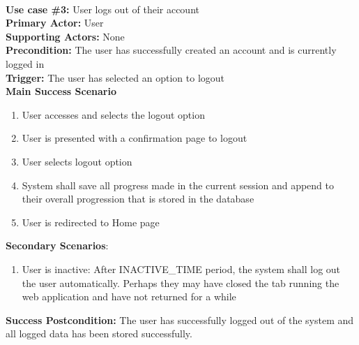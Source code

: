 \documentclass{article}
\begin{document}
\noindent\\
\textbf{Use case \#3:} User logs out of their account\\
\textbf{Primary Actor:} User\\
\textbf{Supporting Actors:} None\\
\textbf{Precondition:} The user has successfully created an account and is currently logged in\\
\textbf{Trigger:} The user has selected an option to logout\\
\textbf{Main Success Scenario}
\begin{enumerate}
    \item User accesses and selects the logout option
    \item User is presented with a confirmation page to logout
    \item User selects logout option
    \item System shall save all progress made in the current session and append to their overall progression that is stored in the database
    \item User is redirected to Home page
\end{enumerate}
\textbf{Secondary Scenarios}:
\begin{enumerate}
    \item User is inactive: After INACTIVE\_TIME period, the system shall log out the user automatically. Perhaps they may have closed the tab running the web application and have not returned for a while
\end{enumerate}
\textbf{Success Postcondition:} The user has successfully logged out of the system and all logged data has been stored successfully. \newline
\end{document}
